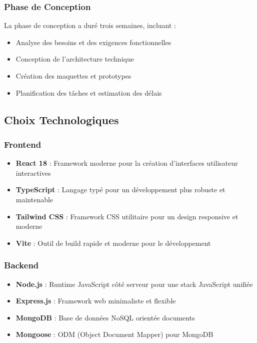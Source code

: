 \documentclass[12pt,a4paper]{article}
\begin{document}
\subsubsection{Phase de Conception}
La phase de conception a duré trois semaines, incluant :
\begin{itemize}
    \item Analyse des besoins et des exigences fonctionnelles
    \item Conception de l'architecture technique
    \item Création des maquettes et prototypes
    \item Planification des tâches et estimation des délais
\end{itemize}

\subsection{Choix Technologiques}

\subsubsection{Frontend}
\begin{itemize}
    \item \textbf{React 18} : Framework moderne pour la création d'interfaces utilisateur interactives
    \item \textbf{TypeScript} : Langage typé pour un développement plus robuste et maintenable
    \item \textbf{Tailwind CSS} : Framework CSS utilitaire pour un design responsive et moderne
    \item \textbf{Vite} : Outil de build rapide et moderne pour le développement
\end{itemize}

\subsubsection{Backend}
\begin{itemize}
    \item \textbf{Node.js} : Runtime JavaScript côté serveur pour une stack JavaScript unifiée
    \item \textbf{Express.js} : Framework web minimaliste et flexible
    \item \textbf{MongoDB} : Base de données NoSQL orientée documents
    \item \textbf{Mongoose} : ODM (Object Document Mapper) pour MongoDB
\end{itemize}
\end{document}
